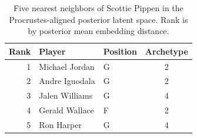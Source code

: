\begin{table}[htbp]
  \centering\small
  \begin{tabular}{rllc}
    \toprule
    Rank & Player & Position & Archetype \\
    \midrule
    1 & Michael Jordan & G & 2 \\
    2 & Andre Iguodala & G & 2 \\
    3 & Jalen Williams & G & 4 \\
    4 & Gerald Wallace & F & 2 \\
    5 & Ron Harper & G & 4 \\
    \bottomrule
  \end{tabular}
  \caption{Five nearest neighbors of Scottie Pippen in the Procrustes-aligned posterior latent space. Rank is by posterior mean embedding distance.}
  \label{tab:Scottie_Pippen_neighbors}
\end{table}

